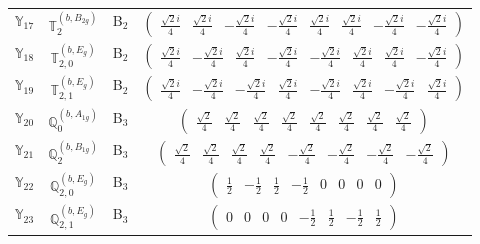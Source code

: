 \documentclass[fleqn,10pt,landscape]{article}
\begin{document}
\begin{itemize}
\begin{center}
\begin{longtable}{c|c|c|c}
$ \mathbb{Y}_{17} $ & $\mathbb{T}_{2}^{(b,B_{2g})}$ & B$_{2}$ & $\begin{pmatrix} \frac{\sqrt{2} i}{4} & \frac{\sqrt{2} i}{4} & - \frac{\sqrt{2} i}{4} & - \frac{\sqrt{2} i}{4} & \frac{\sqrt{2} i}{4} & \frac{\sqrt{2} i}{4} & - \frac{\sqrt{2} i}{4} & - \frac{\sqrt{2} i}{4} \end{pmatrix}$ \\
$ \mathbb{Y}_{18} $ & $\mathbb{T}_{2,0}^{(b,E_{g})}$ & B$_{2}$ & $\begin{pmatrix} \frac{\sqrt{2} i}{4} & - \frac{\sqrt{2} i}{4} & \frac{\sqrt{2} i}{4} & - \frac{\sqrt{2} i}{4} & - \frac{\sqrt{2} i}{4} & \frac{\sqrt{2} i}{4} & \frac{\sqrt{2} i}{4} & - \frac{\sqrt{2} i}{4} \end{pmatrix}$ \\
$ \mathbb{Y}_{19} $ & $\mathbb{T}_{2,1}^{(b,E_{g})}$ & B$_{2}$ & $\begin{pmatrix} \frac{\sqrt{2} i}{4} & - \frac{\sqrt{2} i}{4} & - \frac{\sqrt{2} i}{4} & \frac{\sqrt{2} i}{4} & - \frac{\sqrt{2} i}{4} & \frac{\sqrt{2} i}{4} & - \frac{\sqrt{2} i}{4} & \frac{\sqrt{2} i}{4} \end{pmatrix}$ \\ \hline
$ \mathbb{Y}_{20} $ & $\mathbb{Q}_{0}^{(b,A_{1g})}$ & B$_{3}$ & $\begin{pmatrix} \frac{\sqrt{2}}{4} & \frac{\sqrt{2}}{4} & \frac{\sqrt{2}}{4} & \frac{\sqrt{2}}{4} & \frac{\sqrt{2}}{4} & \frac{\sqrt{2}}{4} & \frac{\sqrt{2}}{4} & \frac{\sqrt{2}}{4} \end{pmatrix}$ \\
$ \mathbb{Y}_{21} $ & $\mathbb{Q}_{2}^{(b,B_{1g})}$ & B$_{3}$ & $\begin{pmatrix} \frac{\sqrt{2}}{4} & \frac{\sqrt{2}}{4} & \frac{\sqrt{2}}{4} & \frac{\sqrt{2}}{4} & - \frac{\sqrt{2}}{4} & - \frac{\sqrt{2}}{4} & - \frac{\sqrt{2}}{4} & - \frac{\sqrt{2}}{4} \end{pmatrix}$ \\
$ \mathbb{Y}_{22} $ & $\mathbb{Q}_{2,0}^{(b,E_{g})}$ & B$_{3}$ & $\begin{pmatrix} \frac{1}{2} & - \frac{1}{2} & \frac{1}{2} & - \frac{1}{2} & 0 & 0 & 0 & 0 \end{pmatrix}$ \\
$ \mathbb{Y}_{23} $ & $\mathbb{Q}_{2,1}^{(b,E_{g})}$ & B$_{3}$ & $\begin{pmatrix} 0 & 0 & 0 & 0 & - \frac{1}{2} & \frac{1}{2} & - \frac{1}{2} & \frac{1}{2} \end{pmatrix}$ \\

\end{longtable}
\end{center}
\end{itemize}
\end{document}
